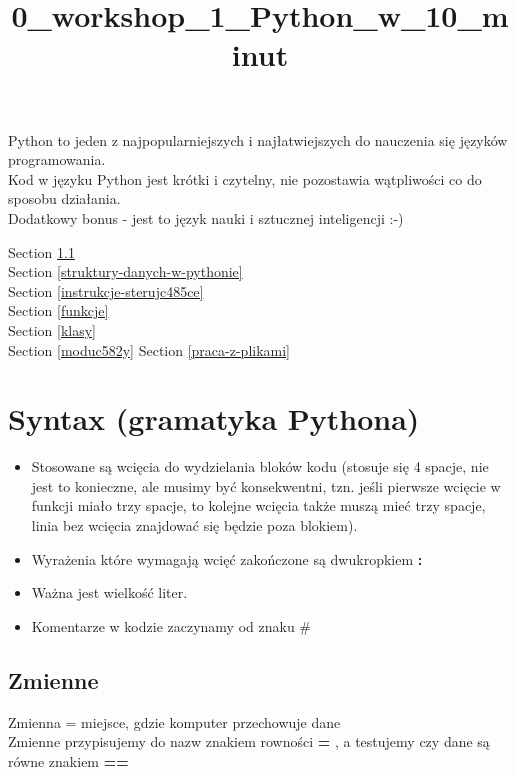 \documentclass[11pt]{article}
\title{0\_workshop\_1\_Python\_w\_10\_minut}
\providecommand{\tightlist}{%
      \setlength{\itemsep}{0pt}\setlength{\parskip}{0pt}}
\begin{document}
    
    
    \maketitle
    
    

    
    

    Python to jeden z najpopularniejszych i najłatwiejszych do nauczenia się
języków programowania.\\
Kod w języku Python jest krótki i czytelny, nie pozostawia wątpliwości
co do sposobu działania.\\
Dodatkowy bonus - jest to język nauki i sztucznej inteligencji :-)

    Section \ref{zmienne}\\
Section \ref{struktury-danych-w-pythonie}\\
Section \ref{instrukcje-sterujc485ce}\\
Section \ref{funkcje}\\
Section \ref{klasy}\\
Section \ref{moduc582y} Section \ref{praca-z-plikami}

    \section{Syntax (gramatyka Pythona)}\label{syntax-gramatyka-pythona}

\begin{itemize}
\tightlist
\item
  Stosowane są wcięcia do wydzielania bloków kodu (stosuje się 4 spacje,
  nie jest to konieczne, ale musimy być konsekwentni, tzn. jeśli
  pierwsze wcięcie w funkcji miało trzy spacje, to kolejne wcięcia także
  muszą mieć trzy spacje, linia bez wcięcia znajdować się będzie poza
  blokiem).
\item
  Wyrażenia które wymagają wcięć zakończone są dwukropkiem \textbf{:}
\item
  Ważna jest wielkość liter.
\item
  Komentarze w kodzie zaczynamy od znaku \#
\end{itemize}

    \subsection{Zmienne}\label{zmienne}

Zmienna = miejsce, gdzie komputer przechowuje dane\\
Zmienne przypisujemy do nazw znakiem rowności \textbf{=} , a testujemy
czy dane są równe znakiem \textbf{==}
\end{document}
